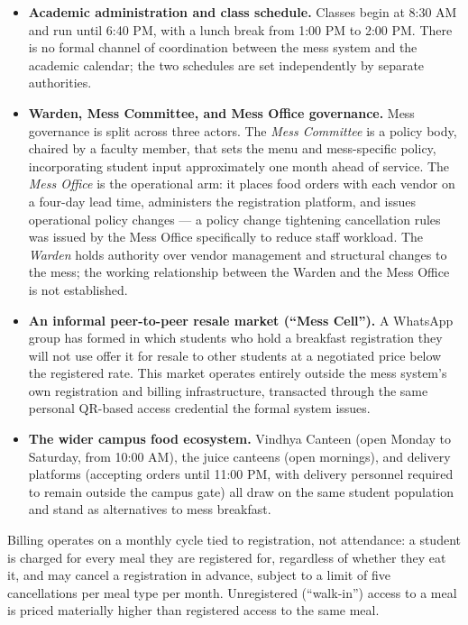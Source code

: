 \documentclass[11pt]{article}
\begin{document}
\begin{itemize}
    \item \textbf{Academic administration and class schedule.} Classes begin at 8:30
        AM and run until 6:40 PM, with a lunch break from 1:00 PM to 2:00 PM. There is
        no formal channel of coordination between the mess system and the academic
        calendar; the two schedules are set independently by separate authorities.
    \item \textbf{Warden, Mess Committee, and Mess Office governance.} Mess governance
        is split across three actors. The \emph{Mess Committee} is a policy body,
        chaired by a faculty member, that sets the menu and mess-specific policy,
        incorporating student input approximately one month ahead of service. The
        \emph{Mess Office} is the operational arm: it places food orders with each
        vendor on a four-day lead time, administers the registration platform, and
        issues operational policy changes --- a policy change tightening cancellation
        rules was issued by the Mess Office specifically to reduce staff workload. The
        \emph{Warden} holds authority over vendor management and structural changes to
        the mess; the working relationship between the Warden and the Mess Office is
        not established.
    \item \textbf{An informal peer-to-peer resale market (``Mess Cell'').} A WhatsApp
        group has formed in which students who hold a breakfast registration they will
        not use offer it for resale to other students at a negotiated price below the
        registered rate. This market operates entirely outside the mess system's own
        registration and billing infrastructure, transacted through the same personal
        QR-based access credential the formal system issues.
    \item \textbf{The wider campus food ecosystem.} Vindhya Canteen (open Monday to
        Saturday, from 10:00 AM), the juice canteens (open mornings), and delivery
        platforms (accepting orders until 11:00 PM, with delivery personnel required to
        remain outside the campus gate) all draw on the same student population and
        stand as alternatives to mess breakfast.
\end{itemize}

Billing operates on a monthly cycle tied to registration, not attendance: a student is
charged for every meal they are registered for, regardless of whether they eat it, and
may cancel a registration in advance, subject to a limit of five cancellations per meal
type per month. Unregistered (``walk-in'') access to a meal is priced materially higher
than registered access to the same meal.
\end{document}
